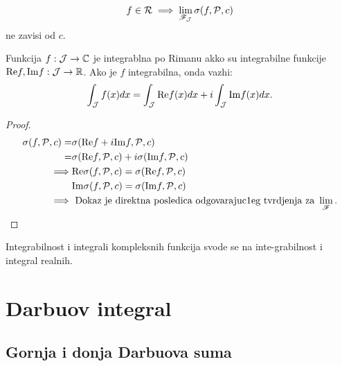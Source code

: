 \documentclass[../main.tex]{subfiles}
\begin{document}
    \nap $$f \in \mathcal{R} \implies \lim_{\mathscr{F}_{\mathcal{J}}}\sigma(f,\mathcal{P},c)$$ ne zavisi od $c$.

    \begin{tvr}
	Funkcija $f: \mathcal{J} \to \mathbb{C}$ je integrablna po Rimanu akko su integrabilne funkcije $\mathrm{Re} f, \mathrm{Im} f: \mathcal{J} \to \mathbb{R}$. Ako je $f$ integrabilna, onda vazhi:
	\[\int_{\mathcal{J}} f(x)dx = \int_{\mathcal{J}} \mathrm{Re} f(x) dx + i\int_{\mathcal{J}}\mathrm{Im} f(x) dx.\]
    \end{tvr}
    \begin{proof}
	\begin{align*}
	    \sigma(f,\mathcal{P},c) = &\sigma(\mathrm{Re} f+ i\mathrm{Im} f,\mathcal{P},c)\\
	    = &\sigma(\mathrm{Re} f,\mathcal{P},c) + i \sigma(\mathrm{Im} f,\mathcal{P},c)\\
	    \implies &\mathrm{Re} \sigma(f,\mathcal{P},c) = \sigma(\mathrm{Re} f,\mathcal{P},c)\\ 
	    & \mathrm{Im} \sigma(f,\mathcal{P},c) = \sigma(\mathrm{Im} f,\mathcal{P},c)\\
	    \implies &\text{ Dokaz je direktna posledica odgovarajuc1eg tvrdjenja za } \lim_{\mathscr{F}}.
	\end{align*}     \end{proof}


    \begin{posl}
    	Integrabilnost i integrali kompleksnih funkcija svode se na inte-grabilnost i integral realnih.
    \end{posl}

\section{Darbuov integral}
\subsection{Gornja i donja Darbuova suma}
\end{document}
